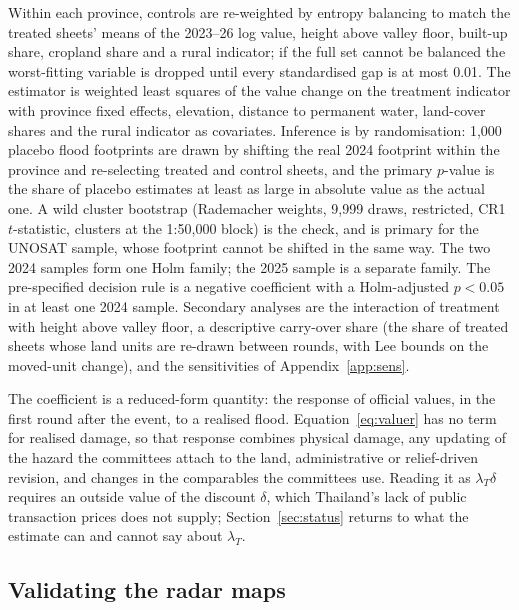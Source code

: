 Within each province, controls are re-weighted by entropy balancing to match the treated sheets' means of the 2023--26 log value, height above valley floor, built-up share, cropland share and a rural indicator; if the full set cannot be balanced the worst-fitting variable is dropped until every standardised gap is at most 0.01. The estimator is weighted least squares of the value change on the treatment indicator with province fixed effects, elevation, distance to permanent water, land-cover shares and the rural indicator as covariates. Inference is by randomisation: 1,000 placebo flood footprints are drawn by shifting the real 2024 footprint within the province and re-selecting treated and control sheets, and the primary $p$-value is the share of placebo estimates at least as large in absolute value as the actual one. A wild cluster bootstrap (Rademacher weights, 9,999 draws, restricted, CR1 $t$-statistic, clusters at the 1:50,000 block) is the check, and is primary for the UNOSAT sample, whose footprint cannot be shifted in the same way. The two 2024 samples form one Holm family; the 2025 sample is a separate family. The pre-specified decision rule is a negative coefficient with a Holm-adjusted $p < 0.05$ in at least one 2024 sample. Secondary analyses are the interaction of treatment with height above valley floor, a descriptive carry-over share (the share of treated sheets whose land units are re-drawn between rounds, with Lee bounds on the moved-unit change), and the sensitivities of Appendix~\ref{app:sens}.

The coefficient is a reduced-form quantity: the response of official values, in the first round after the event, to a realised flood. Equation~\eqref{eq:valuer} has no term for realised damage, so that response combines physical damage, any updating of the hazard the committees attach to the land, administrative or relief-driven revision, and changes in the comparables the committees use. Reading it as $\lambda_T\delta$ requires an outside value of the discount $\delta$, which Thailand's lack of public transaction prices does not supply; Section~\ref{sec:status} returns to what the estimate can and cannot say about $\lambda_T$.

\subsection{Validating the radar maps}\label{sec:validation}

